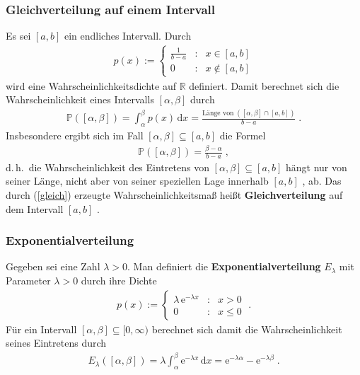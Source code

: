\documentclass[ngerman,draft,parskip=half,twoside]{scrartcl}
\newcommand*{\R}{\mathbb{R}}      %
\newcommand*{\WKM}{\mathbb{P}}      %
\begin{document}
\subsubsection{Gleichverteilung auf einem Intervall}
Es sei $[a,b]$ ein endliches Intervall. Durch
\begin{gather*}
  p(x):=\left\{
     \begin{array}{ccl}
       \frac{1}{b-a} &\colon& x\in [a,b]\\
       0 &\colon& x\notin [a,b]
     \end{array}
     \right.
\end{gather*}
wird eine Wahrscheinlichkeitsdichte auf $\R$ definiert. Damit berechnet sich die Wahrscheinlichkeit
eines Intervalls $[\alpha,\beta]$ durch
\begin{gather}
\label{gleich}
\WKM([\alpha,\beta])=\int_\alpha^\beta p(x)\,\mathrm dx= \frac{\mbox{Länge von}\;([\alpha,\beta]\cap[a,b])}
{b-a}\;.
\end{gather}
Insbesondere ergibt sich im Fall $[\alpha,\beta]\subseteq [a,b]$ die Formel
\begin{gather*}
  \WKM([\alpha,\beta])= \frac{\beta-\alpha}{b-a}\;,
\end{gather*}
d.\,h.~die Wahrscheinlichkeit des Eintretens von $[\alpha,\beta]\subseteq[a,b]$
 hängt nur von seiner Länge, nicht aber von
seiner speziellen Lage innerhalb $[a,b]$ , ab.
Das durch (\ref{gleich}) erzeugte Wahrscheinlichkeitsmaß heißt \textbf{Gleichverteilung} auf dem
Intervall $[a,b]$ .
\subsubsection{Exponentialverteilung}
Gegeben sei eine Zahl $\lambda>0$. Man definiert die
\textbf{Exponentialverteilung} $E_\lambda$ mit Parameter $\lambda>0$ durch
ihre Dichte
\begin{gather*}
  p(x):=\left\{
     \begin{array}{ccr}
       \lambda\,\mathrm e^{-\lambda x} &\colon& x>0\\
       0 &\colon& x\le 0
     \end{array}
     \right.\;.
\end{gather*}
Für ein Intervall $[\alpha,\beta]\subseteq [0,\infty)$ berechnet sich damit
die Wahrscheinlichkeit seines Eintretens durch
\begin{gather*}
  E_\lambda([\alpha,\beta])=\lambda \int_\alpha^\beta \mathrm e^{-\lambda x}\,\mathrm dx
     = \mathrm e^{-\lambda\alpha}- \mathrm e^{-\lambda\beta}\;.
\end{gather*}
\end{document}
